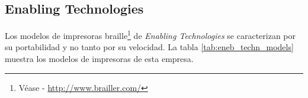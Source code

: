 \begin{table}[htp]
\centering
{}
\caption{Modelos de \emph{Viewplus}} 
\label{tab:viewplus_models}
\end{table}



\subsection{Enabling Technologies}
Los modelos de impresoras braille\footnote{V\'ease -
\url{http://www.brailler.com/}} de \emph{Enabling Technologies} se
caracterizan por su portabilidad y no tanto por su velocidad. La tabla
\ref{tab:eneb_techn_models} muestra los modelos de impresoras de esta empresa.

